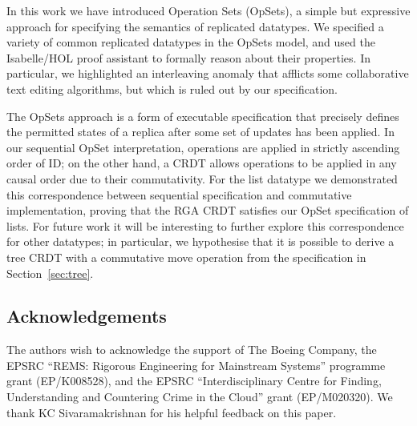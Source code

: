 \documentclass[11pt]{article}
\begin{document}
In this work we have introduced Operation Sets (OpSets), a simple but expressive approach for specifying the semantics of replicated datatypes.
We specified a variety of common replicated datatypes in the OpSets model, and used the Isabelle/HOL proof assistant to formally reason about their properties.
In particular, we highlighted an interleaving anomaly that afflicts some collaborative text editing algorithms, but which is ruled out by our specification.

The OpSets approach is a form of executable specification that precisely defines the permitted states of a replica after some set of updates has been applied.
In our sequential OpSet interpretation, operations are applied in strictly ascending order of ID; on the other hand, a CRDT allows operations to be applied in any causal order due to their commutativity.
For the list datatype we demonstrated this correspondence between sequential specification and commutative implementation, proving that the RGA CRDT satisfies our OpSet specification of lists.
For future work it will be interesting to further explore this correspondence for other datatypes; in particular, we hypothesise that it is possible to derive a tree CRDT with a commutative move operation from the specification in Section~\ref{sec:tree}.


\subsection*{Acknowledgements}

The authors wish to acknowledge the support of The Boeing Company,
the EPSRC ``REMS: Rigorous Engineering for Mainstream Systems'' programme grant (EP/K008528), and
the EPSRC ``Interdisciplinary Centre for Finding, Understanding and Countering Crime in the Cloud'' grant (EP/M020320).
We thank KC Sivaramakrishnan for his helpful feedback on this paper.


{}
\end{document}
